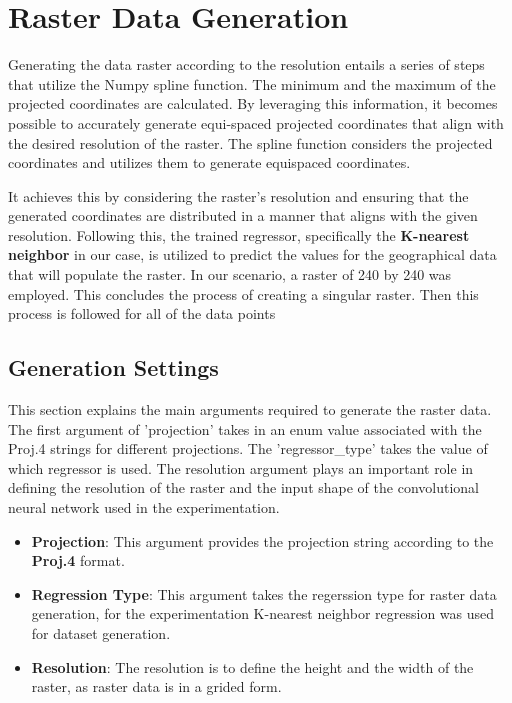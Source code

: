 \section{Raster Data Generation}

Generating the data raster according to the resolution entails a series of steps that utilize the Numpy spline function. The minimum and the maximum of the projected coordinates are calculated. By leveraging this information, it becomes possible to accurately generate equi-spaced projected coordinates that align with the desired resolution of the raster.
The spline function considers the projected coordinates and utilizes them to generate equispaced coordinates.

It achieves this by considering the raster's resolution and ensuring that the generated coordinates are distributed in a manner that aligns with the given resolution.
Following this, the trained regressor, specifically the \textbf{K-nearest neighbor} in our case, is utilized to predict the values for the geographical data that will populate the raster.
In our scenario, a raster of 240 by 240 was employed. This concludes the process of creating a singular raster. Then this process is followed for all of the data points

\subsection{Generation Settings}
This section explains the main arguments required to generate the raster data. The first argument of 'projection' takes in an enum value associated with the Proj.4 strings for different projections. The 'regressor\_type' takes the value of which regressor is used. The resolution argument plays an important role in defining the resolution of the raster and the input shape of the convolutional neural network used in the experimentation.
\begin{itemize}
    \item \textbf{Projection}: This argument provides the projection string according to the \textbf{Proj.4} format.
    \item  \textbf{Regression Type}: This argument takes the regerssion type for raster data generation, for the experimentation K-nearest neighbor regression was used for dataset generation.
    \item \textbf{Resolution}: The resolution is to define the height and the width of the raster, as raster data is in a grided form.
\end{itemize}

